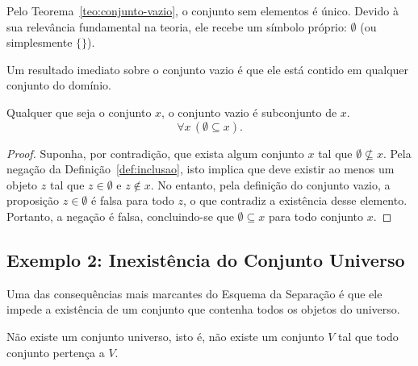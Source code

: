 Pelo Teorema~\ref{teo:conjunto-vazio}, o conjunto sem elementos é único. Devido à sua relevância fundamental na teoria, ele recebe um símbolo próprio: $\emptyset$ (ou simplesmente $\{\}$).

Um resultado imediato sobre o conjunto vazio é que ele está contido em qualquer conjunto do domínio.

\begin{teorema}
\label{teo:vacuidade}
Qualquer que seja o conjunto $x$, o conjunto vazio é subconjunto de $x$.
\begin{equation}\label{eq:vacuidade}
    \forall x\, (\emptyset \subseteq x).
\end{equation}
\end{teorema}

\begin{proof}
Suponha, por contradição, que exista algum conjunto $x$ tal que $\emptyset \nsubseteq x$. Pela negação da Definição~\ref{def:inclusao}, isto implica que deve existir ao menos um objeto $z$ tal que $z \in \emptyset$ e $z \notin x$. No entanto, pela definição do conjunto vazio, a proposição $z \in \emptyset$ é falsa para todo $z$, o que contradiz a existência desse elemento. Portanto, a negação é falsa, concluindo-se que $\emptyset \subseteq x$ para todo conjunto $x$.
\end{proof}

\subsection{Exemplo 2: Inexistência do Conjunto Universo}
\label{sec:inexistencia-conjunto-universo}

Uma das consequências mais marcantes do Esquema da Separação é que ele impede a existência de um conjunto que contenha todos os objetos do universo.

\begin{teorema}
\label{teo:inexistencia-conjunto-universo}
Não existe um conjunto universo, isto é, não existe um conjunto $V$ tal que todo conjunto pertença a $V$.
\end{teorema}

